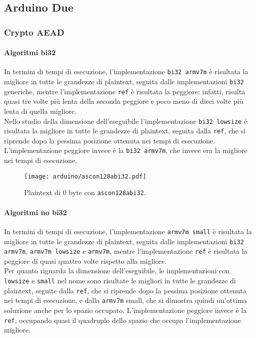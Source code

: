 \subsection{Arduino Due}

\subsubsection{Crypto AEAD}

\paragraph{Algoritmi bi32}

In termini di tempi di esecuzione, l'implementazione \texttt{bi32 armv7m} è risultata la migliore in tutte le grandezze di plaintext, seguita dalle implementazioni \texttt{bi32} generiche, mentre l'implementazione \texttt{ref} è risultata la peggiore: infatti, risulta quasi tre volte più lenta della seconda peggiore e poco meno di dieci volte più lenta di quella migliore. \\

\noindent Nello studio della dimensione dell'eseguibile l'implementazione \texttt{bi32 lowsize} è risultata la migliore in tutte le grandezze di plaintext, seguita dalla \texttt{ref}, che si riprende dopo la pessima posizione ottenuta nei tempi di esecuzione. L'implementazione peggiore invece è la \texttt{bi32 armv7m}, che invece era la migliore nei tempi di esecuzione.

\begin{figure}[H]
    \centering
    \texttt{[image: arduino/ascon128abi32.pdf]}
    \caption{Plaintext di 0 byte con \texttt{ascon128abi32}.}
\end{figure}

\paragraph{Algoritmi no bi32}

In termini di tempi di esecuzione, l'implementazione \texttt{armv7m small} è risultata la migliore in tutte le grandezze di plaintext, seguita dalle implementazioni \texttt{bi32 armv7m}, \texttt{armv7m lowsize} e \texttt{armv7m}, mentre l'implementazione \texttt{ref} è risultata la peggiore di quasi quattro volte rispetto alla migliore. \\

\noindent Per quanto riguarda la dimensione dell'eseguibile, le implementazioni con \texttt{lowsize} e \texttt{small} nel nome sono risultate le migliori in tutte le grandezze di plaintext, seguite dalla \texttt{ref}, che si riprende dopo la pessima posizione ottenuta nei tempi di esecuzione, e dalla \texttt{armv7m} small, che si dimostra quindi un'ottima soluzione anche per lo spazio occupato. L'implementazione peggiore invece è la \texttt{ref}, occupando quasi il quadruplo dello spazio che occupa l'implementazione migliore.

